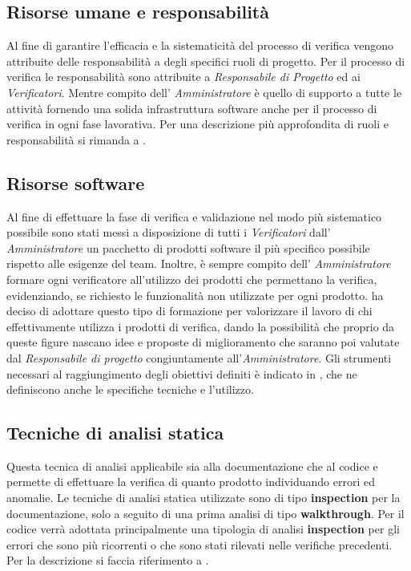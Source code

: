 \subsection{Risorse umane e responsabilità}
Al fine di garantire l'efficacia e la sistematicità del processo di verifica vengono attribuite delle responsabilità a degli specifici ruoli di progetto.
Per il processo di verifica le responsabilità sono attribuite a \textit{Responsabile di Progetto} ed ai \textit{Verificatori}.
Mentre compito dell' \textit{Amministratore} è quello di supporto a tutte le attività fornendo una solida infrastruttura software anche per il processo di verifica in ogni fase lavorativa.
Per una descrizione più approfondita di ruoli e responsabilità si rimanda a \infoNDP.\\
\subsection{Risorse software}
Al fine di effettuare la fase di verifica e validazione nel modo più sistematico possibile sono stati messi a disposizione di tutti i \textit{Verificatori} dall' \textit{Amministratore} un pacchetto di prodotti software il più specifico possibile rispetto alle esigenze del team. Inoltre, è sempre compito dell' \textit{Amministratore} formare ogni verificatore all'utilizzo dei prodotti che permettano la verifica, evidenziando, se richiesto le funzionalità non utilizzate per ogni prodotto. \gruppo{} ha deciso di adottare questo tipo di formazione per valorizzare il lavoro di chi effettivamente utilizza i prodotti di verifica, dando la possibilità che proprio da queste figure nascano idee e proposte di miglioramento che saranno poi valutate dal \textit{Responsabile di progetto} congiuntamente all'\textit{Amministratore}.
Gli strumenti necessari al raggiungimento degli obiettivi definiti è indicato in \infoNDP, che ne definiscono anche le specifiche tecniche e l'utilizzo.
\subsection{Tecniche di analisi statica}
Questa tecnica di analisi applicabile sia alla documentazione che al codice e permette di effettuare la verifica di quanto prodotto individuando errori ed anomalie. Le tecniche di analisi statica utilizzate sono di tipo \textbf{inspection} per la documentazione, solo a seguito di una prima analisi di tipo \textbf{walkthrough}. Per il codice verrà adottata principalmente una tipologia di analisi \textbf{inspection} per gli errori che sono più ricorrenti o che sono stati rilevati nelle verifiche precedenti.
Per la descrizione si faccia riferimento a \infoNDP.
